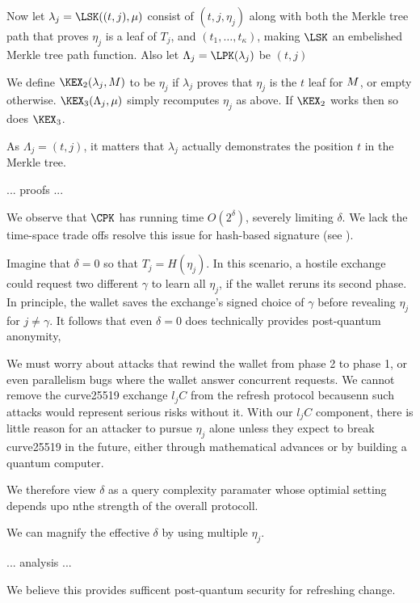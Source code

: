 \documentclass{llncs}
\begin{document}
Now let $\lambda_j = \LSK((t,j),\mu)$ consist of
$(t,j,\eta_j)$ along with both
 the Merkle tree path that proves $\eta_j$ is a leaf of $T_j$,
and $(t_1,\ldots,t_\kappa)$,
 making $\LSK$ an embelished Merkle tree path function.
Also let $\Lambda_j = \LPK(\lambda_j)$ be $(t,j)$

We define $\KEX_2(\lambda_j,\Mu)$ to be $\eta_j$
 if $\lambda_j$ proves that $\eta_j$ is the $t$ leaf for $M$,
or empty otherwise.
$\KEX_3(\Lambda_j,\mu)$ simply recomputes $\eta_j$ as above.
If $\KEX_2$ works then so does $\KEX_3$.

As $\Lambda_j = (t,j)$, it matters that $\lambda_j$ actually
demonstrates the position $t$ in the Merkle tree.

... proofs ...

\smallskip

We observe that $\CPK$ has running time $O(2^\delta)$, severely
limiting $\delta$.  We lack the time-space trade offs resolve
this issue for hash-based signature (see \cite{SPHINCS}).

Imagine that $\delta = 0$ so that $T_j = H(\eta_j)$.
In this scenario, a hostile exchange could request two different
$\gamma$ to learn all $\eta_j$, if the wallet reruns its second
phase.  In principle, the wallet saves the exchange's signed 
choice of $\gamma$ before revealing $\eta_j$ for $j \neq \gamma$.
It follows that even $\delta = 0$ does technically provides
post-quantum anonymity,

We must worry about attacks that rewind the wallet from phase 2 to
phase 1, or even parallelism bugs where the wallet answer concurrent
requests.  We cannot remove the curve25519 exchange $l_j C$ from the
refresh protocol becausenn such attacks would represent serious risks
without it.  With our $l_j C$ component, there is little reason for
an attacker to pursue $\eta_j$ alone unless they expect to break
curve25519 in the future, either through mathematical advances or
by building a quantum computer.  

We therefore view $\delta$ as a query complexity paramater whose 
optimial setting depends upo nthe strength of the overall protocoll. 

\smallskip

We can magnify the effective $\delta$ by using multiple $\eta_j$.

... analysis ...

We believe this provides sufficent post-quantum security for
refreshing change.  
\end{document}
